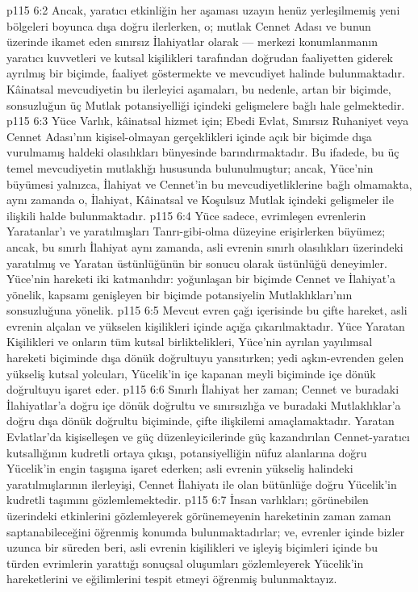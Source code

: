 \vs p115 6:2 Ancak, yaratıcı etkinliğin her aşaması uzayın henüz yerleşilmemiş yeni bölgeleri boyunca dışa doğru ilerlerken, o; mutlak Cennet Adası ve bunun üzerinde ikamet eden sınırsız İlahiyatlar olarak --- merkezi konumlanmanın yaratıcı kuvvetleri ve kutsal kişilikleri tarafından doğrudan faaliyetten giderek ayrılmış bir biçimde, faaliyet göstermekte ve mevcudiyet halinde bulunmaktadır. Kâinatsal mevcudiyetin bu ilerleyici aşamaları, bu nedenle, artan bir biçimde, sonsuzluğun üç Mutlak potansiyelliği içindeki gelişmelere bağlı hale gelmektedir.
\vs p115 6:3 Yüce Varlık, kâinatsal hizmet için; Ebedi Evlat, Sınırsız Ruhaniyet veya Cennet Adası’nın kişisel\hyp{}olmayan gerçeklikleri içinde açık bir biçimde dışa vurulmamış haldeki olasılıkları bünyesinde barındırmaktadır. Bu ifadede, bu üç temel mevcudiyetin mutlaklığı hususunda bulunulmuştur; ancak, Yüce’nin büyümesi yalnızca, İlahiyat ve Cennet’in bu mevcudiyetliklerine bağlı olmamakta, aynı zamanda o, İlahiyat, Kâinatsal ve Koşulsuz Mutlak içindeki gelişmeler ile ilişkili halde bulunmaktadır.
\vs p115 6:4 Yüce sadece, evrimleşen evrenlerin Yaratanlar'ı ve yaratılmışları Tanrı\hyp{}gibi\hyp{}olma düzeyine erişirlerken büyümez; ancak, bu sınırlı İlahiyat aynı zamanda, asli evrenin sınırlı olasılıkları üzerindeki yaratılmış ve Yaratan üstünlüğünün bir sonucu olarak üstünlüğü deneyimler. Yüce’nin hareketi iki katmanlıdır: yoğunlaşan bir biçimde Cennet ve İlahiyat’a yönelik, kapsamı genişleyen bir biçimde potansiyelin Mutlaklıkları’nın sonsuzluğuna yönelik.
\vs p115 6:5 Mevcut evren çağı içerisinde bu çifte hareket, asli evrenin alçalan ve yükselen kişilikleri içinde açığa çıkarılmaktadır. Yüce Yaratan Kişilikleri ve onların tüm kutsal birliktelikleri, Yüce’nin ayrılan yayılımsal hareketi biçiminde dışa dönük doğrultuyu yansıtırken; yedi aşkın\hyp{}evrenden gelen yükseliş kutsal yolcuları, Yücelik’in içe kapanan meyli biçiminde içe dönük doğrultuyu işaret eder.
\vs p115 6:6 Sınırlı İlahiyat her zaman; Cennet ve buradaki İlahiyatlar’a doğru içe dönük doğrultu ve sınırsızlığa ve buradaki Mutlaklıklar’a doğru dışa dönük doğrultu biçiminde, çifte ilişkilemi amaçlamaktadır. Yaratan Evlatlar’da kişiselleşen ve güç düzenleyicilerinde güç kazandırılan Cennet\hyp{}yaratıcı kutsallığının kudretli ortaya çıkışı, potansiyelliğin nüfuz alanlarına doğru Yücelik’in engin taşışına işaret ederken; asli evrenin yükseliş halindeki yaratılmışlarının ilerleyişi, Cennet İlahiyatı ile olan bütünlüğe doğru Yücelik’in kudretli taşımını gözlemlemektedir.
\vs p115 6:7 İnsan varlıkları; görünebilen üzerindeki etkinlerini gözlemleyerek görünemeyenin hareketinin zaman zaman saptanabileceğini öğrenmiş konumda bulunmaktadırlar; ve, evrenler içinde bizler uzunca bir süreden beri, asli evrenin kişilikleri ve işleyiş biçimleri içinde bu türden evrimlerin yarattığı sonuçsal oluşumları gözlemleyerek Yücelik’in hareketlerini ve eğilimlerini tespit etmeyi öğrenmiş bulunmaktayız.

